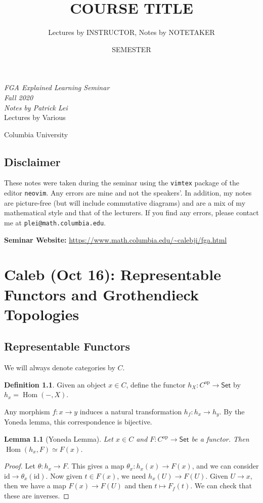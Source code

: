 \documentclass[leqno, openany]{memoir}
\title{COURSE TITLE}
\author{Lectures by INSTRUCTOR, Notes by NOTETAKER}
\date{SEMESTER}
\newtheorem{lem}[thm]{Lemma}
\theoremstyle{definition}
\newtheorem{defn}[thm]{Definition}
\theoremstyle{remark}
\theoremstyle{plain}
\theoremstyle{definition}
\theoremstyle{remark}
\newcommand{\mr}[1]{\mathrm{#1}}
\newcommand{\ms}[1]{\mathsf{#1}}
\DeclareMathOperator{\Hom}{Hom}
\newcommand*{\titleSW}
    {\begingroup%
    \raggedleft
    \vspace*{\baselineskip}
    {\Huge\itshape FGA Explained Learning Seminar \\ Fall 2020}\\[\baselineskip]
    {\large\itshape Notes by Patrick Lei}\\[0.2\textheight]
    {\Large Lectures by Various}\par
    \vfill
    {\Large \sffamily Columbia University}
    \vspace*{\baselineskip}
\endgroup}
\begin{document}
    
\begin{titlingpage}
\titleSW
\end{titlingpage}

\thispagestyle{empty}
\section*{Disclaimer}%
\label{sec:disclaimer}

These notes were taken during the seminar using the \texttt{vimtex} package of the editor \texttt{neovim}. 
Any errors are mine and not the speakers'. 
In addition, my notes are picture-free (but will include commutative diagrams) and are a mix of my mathematical style and that of the lecturers.
If you find any errors, please contact me at \texttt{plei@math.columbia.edu}.

\vspace*{1cm}

\noindent\textbf{Seminar Website:}  \url{https://www.math.columbia.edu/~calebji/fga.html}
\newpage


\tableofcontents

\chapter{Caleb (Oct 16): Representable Functors and Grothendieck Topologies}%
\label{cha:caleb_oct_16_representable_functors_and_grothendieck_topologies}

\section{Representable Functors}%
\label{sec:representable_functors}

We will always denote categories by $C$.
\begin{defn}
    Given an object $x \in C$, define the functor $h_X \colon C^{\mr{op}} \to \ms{Set}$ by $h_x = \Hom(-,X)$.
\end{defn}

Any morphism $f \colon x \to y$ induces a natural transformation $h_f \colon h_x \to h_y$. By the Yoneda lemma, this correspondence is bijective.

\begin{lem}[Yoneda Lemma]
    Let $x \in C$ and $F \colon C^{\mr{op}} \to \ms{Set}$ be a functor. Then $\Hom(h_x,F) \simeq F(x)$.
\end{lem}

\begin{proof}
    Let $\theta \colon h_x \to F$. This gives a map $\theta_x \colon h_x(x) \to F(x)$, and we can consider $\mr{id} \to \theta_x(\mr{id})$. Now given $t \in F(x)$, we need $h_x(U) \to F(U)$. Given $U \to x$, then we have a map $F(x) \to F(U)$ and then $t \mapsto F_f(t)$. We can check that these are inverses.
\end{proof}
\end{document}
